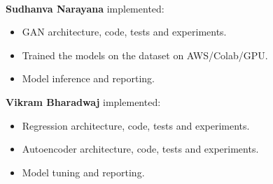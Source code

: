 \documentclass{article}
\begin{document}
\

\textbf{Sudhanva Narayana} implemented:
\begin{itemize}
\item GAN architecture, code, tests and experiments.
\item Trained the models on the dataset on AWS/Colab/GPU.
\item Model inference and reporting.
\end{itemize}



\textbf{Vikram Bharadwaj} implemented:
\begin{itemize}
\item Regression architecture, code, tests and experiments.
\item Autoencoder architecture, code, tests and experiments.
\item Model tuning and reporting.
\end{itemize}
\pagebreak


\end{document}
